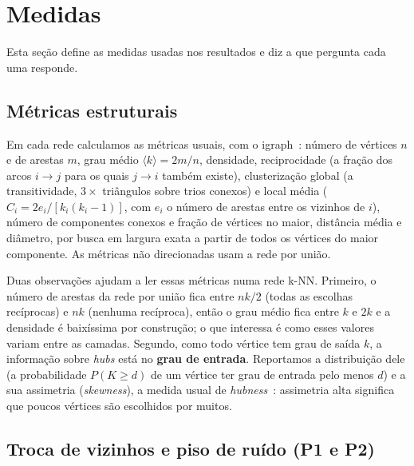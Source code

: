 \section{Medidas}\label{sec:metodos}

Esta seção define as medidas usadas nos resultados e diz a que pergunta cada uma responde.

\subsection{Métricas estruturais}\label{sec:met-estruturais}

Em cada rede calculamos as métricas usuais, com o igraph~\cite{csardi2006}: número de vértices
$n$ e de arestas $m$, grau médio $\langle k\rangle=2m/n$, densidade, reciprocidade (a fração
dos arcos $i\to j$ para os quais $j\to i$ também existe), clusterização global (a
transitividade, $3\times$ triângulos sobre trios conexos) e local média
($C_i=2e_i/[k_i(k_i-1)]$, com $e_i$ o número de arestas entre os vizinhos de $i$), número de
componentes conexos e fração de vértices no maior, distância média e diâmetro, por busca em
largura exata a partir de todos os vértices do maior componente. As métricas não direcionadas
usam a rede por união.

Duas observações ajudam a ler essas métricas numa rede k-NN. Primeiro, o número de arestas da
rede por união fica entre $nk/2$ (todas as escolhas recíprocas) e $nk$ (nenhuma recíproca),
então o grau médio fica entre $k$ e $2k$ e a densidade é baixíssima por construção; o que
interessa é como esses valores variam entre as camadas. Segundo, como todo vértice tem grau de
saída $k$, a informação sobre \emph{hubs} está no \textbf{grau de entrada}. Reportamos a
distribuição dele (a probabilidade $P(K\ge d)$ de um vértice ter grau de entrada pelo menos
$d$) e a sua assimetria (\emph{skewness}), a medida usual de
\emph{hubness}~\cite{radovanovic2010}: assimetria alta significa que poucos vértices são
escolhidos por muitos.

\subsection{Troca de vizinhos e piso de ruído (P1 e P2)}\label{sec:met-jaccard}

